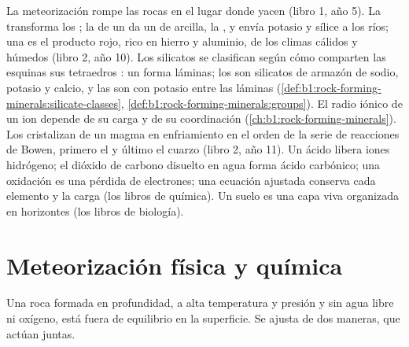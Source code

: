 \begin{recall}
La meteorización rompe las rocas en el lugar donde yacen (libro 1, año 5). La  transforma los ; la
 de un  da un  de arcilla, la , y envía potasio y sílice a los ríos; una  es el producto rojo,
rico en hierro y aluminio, de los climas cálidos y húmedos (libro 2, año 10). Los silicatos se clasifican según cómo comparten las esquinas
sus tetraedros : un  forma láminas; los  son silicatos de armazón de sodio, potasio y calcio, y las 
son  con potasio entre las láminas (\cref{def:b1:rock-forming-minerals:silicate-classes},
\cref{def:b1:rock-forming-minerals:groups}). El radio iónico de un ion depende de su carga y de su coordinación (\cref{ch:b1:rock-forming-minerals}).
Los  cristalizan de un magma en enfriamiento en el orden de la serie de reacciones de Bowen, primero el  y último el
cuarzo (libro 2, año 11). Un ácido libera iones hidrógeno; el dióxido de carbono disuelto en agua forma ácido carbónico; una oxidación es
una pérdida de electrones; una ecuación ajustada conserva cada elemento y la carga (los libros de química). Un suelo es una capa viva
organizada en horizontes (los libros de biología).
\end{recall}

\section{Meteorización física y química}\label{sec:b1:weathering-clays:types}

Una roca formada en profundidad, a alta temperatura y presión y sin agua libre ni oxígeno, está fuera de equilibrio en la superficie.
Se ajusta de dos maneras, que actúan juntas.

